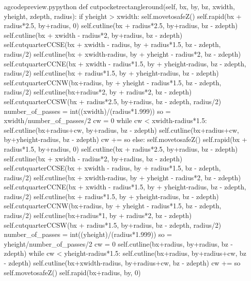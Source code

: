 \documentclass{ltxdoc}
\begin{document}
\begin{writecode}{a}{gcodepreview.py}{python}
    def cutpocketrectangleround(self, bx, by, bz, xwidth, yheight, zdepth, radius):
        if yheight > xwidth:
            self.movetosafeZ()
            self.rapid(bx + radius*2.5, by+radius, 0)
            self.cutline(bx + radius*2.5, by+radius, bz - zdepth)
            self.cutline(bx + xwidth - radius*2, by+radius, bz - zdepth)
            self.cutquarterCCSE(bx + xwidth - radius, by + radius*1.5, bz - zdepth, radius/2) 
            self.cutline(bx + xwidth-radius, by + yheight - radius*2, bz - zdepth)
            self.cutquarterCCNE(bx + xwidth - radius*1.5, by + yheight-radius, bz - zdepth, radius/2) 
            self.cutline(bx + radius*1.5, by + yheight-radius, bz - zdepth)
            self.cutquarterCCNW(bx+radius, by + yheight - radius*1.5, bz - zdepth, radius/2) 
            self.cutline(bx+radius*2, by + radius*2, bz - zdepth)
            self.cutquarterCCSW(bx + radius*2.5, by+radius, bz - zdepth, radius/2)
            number_of_passes = int((xwidth)/(radius*1.999)) 
            so = xwidth/number_of_passes/2
            cw = 0
            while cw < xwidth-radius*1.5:
                self.cutline(bx+radius+cw, by+radius, bz - zdepth)
                self.cutline(bx+radius+cw, by+yheight-radius, bz - zdepth)
                cw += so
        else:
            self.movetosafeZ()
            self.rapid(bx + radius*1.5, by+radius, 0)
            self.cutline(bx + radius*2.5, by+radius, bz - zdepth)
            self.cutline(bx + xwidth - radius*2, by+radius, bz - zdepth)
            self.cutquarterCCSE(bx + xwidth - radius, by + radius*1.5, bz - zdepth, radius/2) 
            self.cutline(bx + xwidth-radius, by + yheight - radius*2, bz - zdepth)
            self.cutquarterCCNE(bx + xwidth - radius*1.5, by + yheight-radius, bz - zdepth, radius/2) 
            self.cutline(bx + radius*1.5, by + yheight-radius, bz - zdepth)
            self.cutquarterCCNW(bx+radius, by + yheight - radius*1.5, bz - zdepth, radius/2) 
            self.cutline(bx+radius*1, by + radius*2, bz - zdepth)
            self.cutquarterCCSW(bx + radius*1.5, by+radius, bz - zdepth, radius/2)
            number_of_passes = int((yheight)/(radius*1.999)) 
            so = yheight/number_of_passes/2
            cw = 0
            self.cutline(bx+radius, by+radius, bz - zdepth)
            while cw < yheight-radius*1.5:
                self.cutline(bx+radius, by+radius+cw, bz - zdepth)
                self.cutline(bx+xwidth-radius, by+radius+cw, bz - zdepth)
                cw += so
        self.movetosafeZ()
        self.rapid(bx+radius, by, 0)

\end{writecode}
\addtocounter{gcpy}{60}
\end{document}
